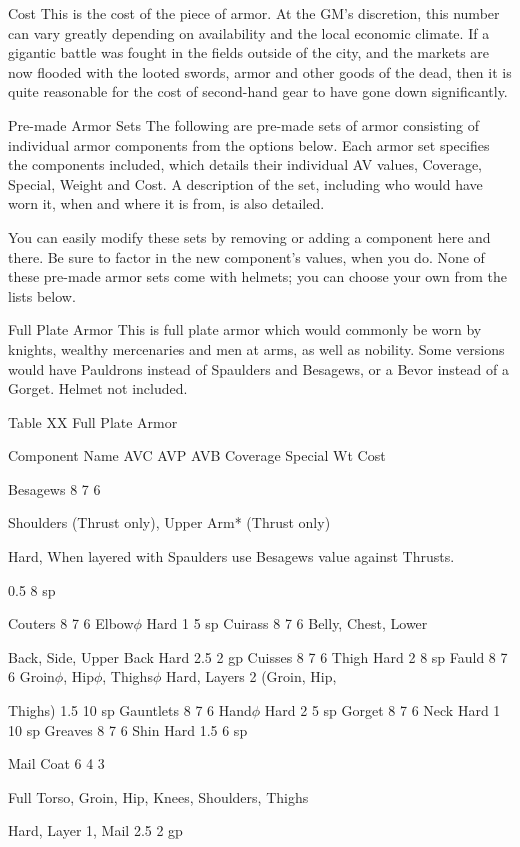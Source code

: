 \documentclass[oneside,11pt,english]{book}
\begin{document}
Cost
This is the cost of the piece of armor. At the GM’s discretion, this number can vary greatly depending on availability 
and the local economic climate. If a gigantic battle was fought in the fields outside of the city, and the markets are 
now flooded with the looted swords, armor and other goods of the dead, then it is quite reasonable for the cost of 
second-hand gear to have gone down significantly.

Pre-made Armor Sets
The following are pre-made sets of armor consisting of individual armor components from the options below. Each 
armor set specifies the components included, which details their individual AV values, Coverage, Special, Weight and 
Cost. A description of the set, including who would have worn it, when and where it is from, is also detailed. 

You can easily modify these sets by removing or adding a component here and there. Be sure to factor in the new 
component’s values, when you do. None of these pre-made armor sets come with helmets; you can choose your own 
from the lists below.

Full Plate Armor
This is full plate armor which would commonly be worn by knights, wealthy mercenaries and men at arms, as well as 
nobility. Some versions would have Pauldrons instead of Spaulders and Besagews, or a Bevor instead of a Gorget. 
Helmet not included.

Table XX Full Plate Armor


Component Name AVC AVP AVB Coverage Special Wt Cost

Besagews 8 7 6

Shoulders (Thrust only), 
Upper Arm* (Thrust 
only)

Hard, When layered with 
Spaulders use Besagews value 
against Thrusts.

0.5 8 sp

Couters 8 7 6 Elbow$\phi$ Hard 1 5 sp
Cuirass 8 7 6 Belly, Chest, Lower 

Back, Side, Upper Back Hard 2.5 2 gp
Cuisses 8 7 6 Thigh Hard 2 8 sp
Fauld 8 7 6 Groin$\phi$, Hip$\phi$, Thighs$\phi$ Hard, Layers 2 (Groin, Hip, 

Thighs) 1.5 10 sp
Gauntlets 8 7 6 Hand$\phi$ Hard 2 5 sp
Gorget 8 7 6 Neck Hard 1 10 sp
Greaves 8 7 6 Shin Hard 1.5 6 sp

Mail Coat 6 4 3

Full Torso, Groin, Hip, 
Knees, Shoulders, 
Thighs

Hard, Layer 1, Mail 2.5 2 gp
\end{document}
